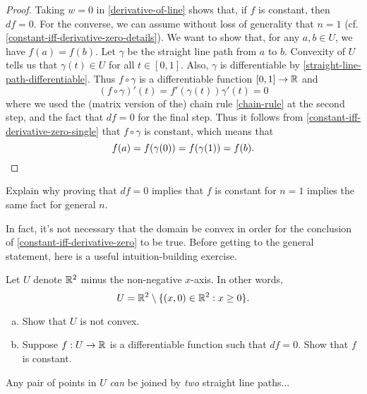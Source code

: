 \begin{proof}
	Taking $w = 0$ in \cref{derivative-of-line} shows that, if $f$ is constant, then $df = 0$. For the converse, we can assume without loss of generality that $n = 1$ (cf. \cref{constant-iff-derivative-zero-details}). We want to show that, for any $a,  b \in U$, we have $f(a) = f(b)$. Let $\gamma$ be the straight line path from $a$ to $b$. Convexity of $U$ tells us that $\gamma(t) \in U$ for all $t \in [0,1]$. Also, $\gamma$ is differentiable by \cref{straight-line-path-differentiable}. Thus $f \circ \gamma$ is a differentiable function $[0,1] \to \mathbb{R}$ and 
	\[ (f \circ \gamma)'(t) = f'(\gamma(t)) \gamma'(t) = 0 \]
	where we used the (matrix version of the) chain rule \ref{chain-rule} at the second step, and the fact that $df = 0$ for the final step. Thus it follows from \cref{constant-iff-derivative-zero-single} that $f \circ \gamma$ is constant, which means that
	\[ f(a) = f(\gamma(0)) = f(\gamma(1)) = f(b). \qedhere \]
\end{proof}

\begin{exercise} \label{constant-iff-derivative-zero-details}
	 Explain why proving that $df = 0$ implies that $f$ is constant for $n = 1$ implies the same fact for general $n$. 
\end{exercise}

In fact, it's not necessary that the domain be convex in order for the conclusion of \cref{constant-iff-derivative-zero} to be true. Before getting to the general statement, here is a useful intuition-building exercise. 

\begin{exercise}
	Let $U$ denote $\mathbb{R}^2$ minus the non-negative $x$-axis. In other words,
	\[ U = \mathbb{R}^2 \setminus \{ (x, 0) \in \mathbb{R}^2 : x \geq 0 \}. \]
	\begin{enumerate}[(a)]
		\item Show that $U$ is not convex. 
		\item Suppose $f : U \to \mathbb{R}$ is a differentiable function such that $df = 0$. Show that $f$ is constant.
	\end{enumerate} 
	\begin{hint}
		Any pair of points in $U$ \emph{can} be joined by \emph{two} straight line paths...
	\end{hint}
\end{exercise}

